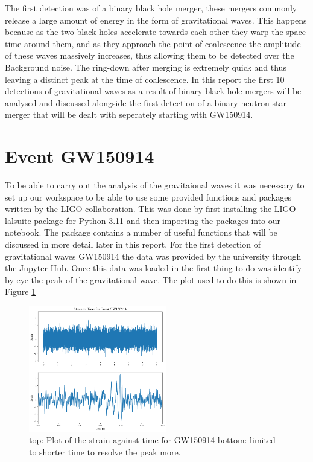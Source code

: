 \documentclass[]{article}
\begin{document}
The first detection was of a binary black hole merger, these mergers commonly
release a large amount of energy in the form of gravitational waves. This happens
because as the two black holes accelerate towards each other they warp the
space-time around them, and as they approach the point of coalescence the amplitude
of these waves massively increases, thus allowing them to be detected over the Background
noise. The ring-down after merging is extremely quick and thus leaving a distinct peak
at the time of coalescence. In this report the first 10 detections of gravitational waves
as a result of binary black hole mergers will be analysed and discussed alongside the first detection
of a binary neutron star merger that will be dealt with seperately starting with GW150914.

\section*{Event GW150914}
To be able to carry out the analysis of the gravitaional waves it was necessary to set
up our workspace to be able to use some provided functions and packages written by the
LIGO collaboration. This was done by first installing the LIGO lalsuite package for Python 3.11
and then importing the packages into our notebook. The package contains a number of useful
functions that will be discussed in more detail later in this report.
For the first detection of gravitational waves GW150914 the data was provided
by the university through the Jupyter Hub. Once this data was loaded in
the first thing to do was identify by eye the peak
of the gravitational wave. The plot used to do this is shown in Figure \ref{fig:GW150914}
\begin{figure}
    \includegraphics[width=6cm]{images/Signal_gw150914.png}
    \caption{top: Plot of the strain against time for GW150914 bottom:
    limited to shorter time to resolve the peak more.}
    \label{fig:GW150914}
\end{figure}
\end{document}
